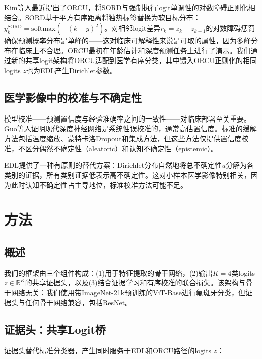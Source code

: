 \documentclass[12pt,a4paper]{ctexart}
\begin{document}
Kim等人最近提出了ORCU\cite{kim2025orcu}，将SORD与强制执行logit单调性的对数障碍正则化相结合。SORD基于平方有序距离将独热标签替换为软目标分布：$y_k^{\mathrm{SORD}} = \mathrm{softmax}(-(k - y)^2)$。对相邻logit差异$r_k = z_k - z_{k+1}$的对数障碍惩罚确保预测概率分布是单峰的——这对临床可解释性来说是可取的属性，因为多峰分布在临床上不合理。ORCU最初在年龄估计和深度预测任务上进行了演示。我们通过新的共享logit架构将ORCU适配到医学有序分类，其中馈入ORCU正则化的相同logits $z$也为EDL产生Dirichlet参数。

\subsection{医学影像中的校准与不确定性}

模型校准——预测置信度与经验准确率之间的一致性——对临床部署至关重要。Guo等人证明现代深度神经网络是系统性误校准的，通常高估置信度\cite{guo2017calibration}。标准的缓解方法包括温度缩放、蒙特卡洛Dropout\cite{gal2016dropout}和集成方法\cite{lakshminarayanan2017ensemble}，但这些方法仅提供置信度校准，不区分偶然不确定性（aleatoric）和认知不确定性（epistemic）\cite{abdar2021uncertainty,liang2018uncertainty}。

EDL提供了一种有原则的替代方案：Dirichlet分布自然地将总不确定性$u$分解为各类别的证据，所有类别证据低表示高不确定性。这对小样本医学影像特别相关，因为此时认知不确定性占主导地位，标准校准方法可能不足。

\section{方法}

\subsection{概述}

我们的框架由三个组件构成：(1)用于特征提取的骨干网络，(2)输出$K=4$类logits $z \in \mathbb{R}^K$的共享证据头，以及(3)结合证据学习和有序校准的联合损失。该架构与骨干网络无关：我们使用带ImageNet-21k预训练的ViT-Base\cite{dosovitskiy2020vit}进行氟斑牙分类\cite{raghu2019transfusion}，但证据头与任何骨干网络兼容，包括ResNet\cite{he2016resnet}。

\subsection{证据头：共享Logit桥}

证据头替代标准分类器，产生同时服务于EDL和ORCU路径的logits $z$：
\end{document}
